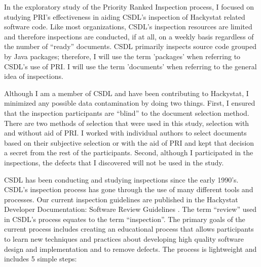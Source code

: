 In the exploratory study of the Priority Ranked Inspection process, I
focused on studying PRI's effectiveness in aiding CSDL's inspection of
Hackystat related software code. Like most organizations, CSDL's inspection
resources are limited and therefore inspections are conducted, if at all,
on a weekly basis regardless of the number of ``ready'' documents. CSDL
primarily inspects source code grouped by Java packages; therefore, I will
use the term 'packages' when referring to CSDL's use of PRI. I will use the
term 'documents' when referring to the general idea of inspections.

Although I am a member of CSDL and have been contributing to Hackystat, I
minimized any possible data contamination by doing two things. First, I
ensured that the inspection participants are ``blind'' to the document
selection method. There are two methods of selection that were used in this
study, selection with and without aid of PRI. I worked with individual
authors to select documents based on their subjective selection or with the
aid of PRI and kept that decision a secret from the rest of the
participants. Second, although I participated in the inspections, the
defects that I discovered will not be used in the study.


CSDL has been conducting and studying inspections since the early 1990's.
CSDL's inspection process has gone through the use of many different tools
and processes. Our current inspection guidelines are published in the
Hackystat Developer Documentation: Software Review Guidelines
\cite{SoftwareReviewGuidelines}. The term ``review'' used in CSDL's process
equates to the term ``inspection''. The primary goals of the current
process includes creating an educational process that allows participants
to learn new techniques and practices about developing high quality
software design and implementation and to remove defects. The process is
lightweight and includes 5 simple steps:

